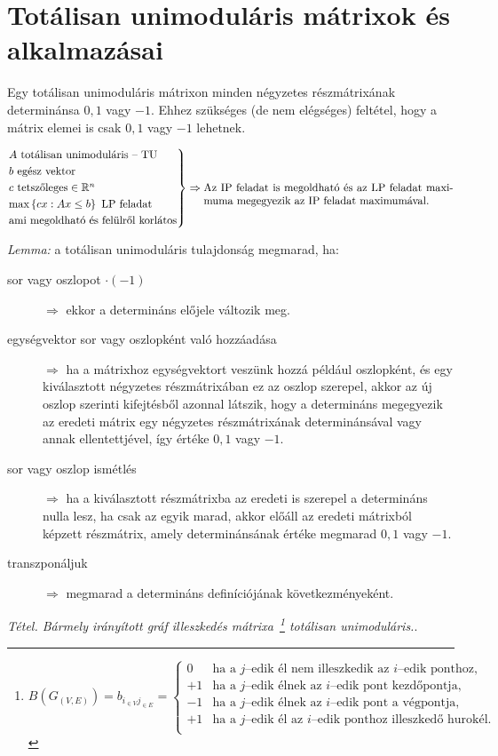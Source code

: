 \skiptooddpage
\section{Totálisan unimoduláris mátrixok és alkalmazásai}

Egy totálisan unimoduláris mátrixon minden négyzetes részmátrixának determinánsa
$0, 1$ vagy $-1$. Ehhez szükséges (de nem elégséges) feltétel, hogy a mátrix
elemei is csak $0, 1$ vagy $-1$ lehetnek.

\[
\begin{rcases}
A \text{ totálisan unimoduláris -- TU} \\
b \text{ egész vektor} \\
c \text{ tetszőleges} \in \mathbb{R}^n \\
\text{max} \left\{ cx:Ax \leq b \right\} \text{ LP feladat}\\
\text{ami megoldható és felülről korlátos}
\end{rcases} \Rightarrow \parbox[t]{8cm}{ Az IP feladat is megoldható és az LP
feladat maximuma megegyezik az IP feladat maximumával.} \]

\emph{Lemma:} a totálisan unimoduláris tulajdonság megmarad, ha:

\begin{description}
\item[sor vagy oszlopot $\cdot (-1)$] $\Rightarrow$ ekkor a determináns
előjele változik meg.
\item[egységvektor sor vagy oszlopként való hozzáadása] $\Rightarrow$ ha a
mátrixhoz egységvektort veszünk hozzá például oszlopként, és egy kiválasztott
négyzetes részmátrixában ez az oszlop szerepel, akkor az új oszlop szerinti
kifejtésből azonnal látszik, hogy a determináns megegyezik az eredeti mátrix
egy négyzetes részmátrixának determinánsával vagy annak ellentettjével, így
értéke $0, 1$ vagy $-1$.
\item[sor vagy oszlop ismétlés] $\Rightarrow$ ha a kiválasztott részmátrixba
az eredeti is szerepel a determináns nulla lesz, ha csak az egyik marad, akkor
előáll az eredeti mátrixból képzett részmátrix, amely determinánsának értéke
megmarad $0, 1$ vagy $-1$.
\item[transzponáljuk] $\Rightarrow$ megmarad a determináns definíciójának
következményeként.
\end{description}

\emph{Tétel. Bármely irányított gráf illeszkedés mátrixa~\footnote{$
B(G_{(V,E)})=
b_{i_{\in V}j_{\in E}}=
\begin{cases}
0  & \text{ha a } j \text{--edik él nem illeszkedik az } i \text{--edik ponthoz,} \\
+1  & \text{ha a } j \text{--edik élnek az } i \text{--edik pont kezdőpontja,} \\
-1  & \text{ha a } j \text{--edik élnek az } i \text{--edik pont a végpontja,} \\
+1  & \text{ha a } j \text{--edik él az } i \text{--edik ponthoz illeszkedő hurokél.} \\
\end{cases}$} totálisan unimoduláris.}.
\vspace{0.4cm}

